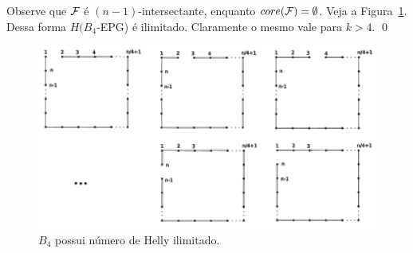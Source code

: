 Observe que $\cal{F}$ é $(n-1)$-intersectante, enquanto $core({\cal{F}})=\emptyset$. Veja a Figura~\ref{fig:figurab4}. Dessa forma $H(B_4$-EPG) é ilimitado. Claramente o mesmo vale para $k >4$. \qed  



\begin{figure}[!h]
\begin{center}












\includegraphics[width=12.5cm]{./img/b4epg.pdf}
\end{center}
\caption{$B_4$ possui número de Helly ilimitado.}\label{fig:figurab4}
\end{figure}

